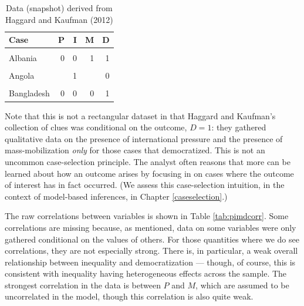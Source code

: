 \documentclass[
  12pt,
]{book}
\begin{document}
\begin{table}

\caption{\label{tab:data82}Data (snapshot) derived from Haggard and Kaufman (2012)}
\centering
\begin{tabular}[t]{lrrrr}
\toprule
Case & P & I & M & D\\
\midrule
\cellcolor{gray!6}{Afghanistan} & \cellcolor{gray!6}{} & \cellcolor{gray!6}{1} & \cellcolor{gray!6}{} & \cellcolor{gray!6}{0}\\
Albania & 0 & 0 & 1 & 1\\
\cellcolor{gray!6}{Algeria} & \cellcolor{gray!6}{} & \cellcolor{gray!6}{0} & \cellcolor{gray!6}{} & \cellcolor{gray!6}{0}\\
Angola &  & 1 &  & 0\\
\cellcolor{gray!6}{Argentina} & \cellcolor{gray!6}{0} & \cellcolor{gray!6}{0} & \cellcolor{gray!6}{1} & \cellcolor{gray!6}{1}\\
\addlinespace
Bangladesh & 0 & 0 & 0 & 1\\
\bottomrule
\end{tabular}
\end{table}

Note that this is not a rectangular dataset in that Haggard and Kaufman's collection of clues was conditional on the outcome, \(D=1\): they gathered qualitative data on the presence of international pressure and the presence of mass-mobilization \emph{only} for those cases that democratized. This is not an uncommon case-selection principle. The analyst often reasons that more can be learned about how an outcome arises by focusing in on cases where the outcome of interest has in fact occurred. (We assess this case-selection intuition, in the context of model-based inferences, in Chapter \ref{caseselection}.)

The raw correlations between variables is shown in Table \ref{tab:pimdcorr}. Some correlations are missing because, as mentioned, data on some variables were only gathered conditional on the values of others. For those quantities where we do see correlations, they are not especially strong. There is, in particular, a weak overall relationship between inequality and democratization --- though, of course, this is consistent with inequality having heterogeneous effects across the sample. The strongest correlation in the data is between \(P\) and \(M\), which are assumed to be uncorrelated in the model, though this correlation is also quite weak.
\end{document}

